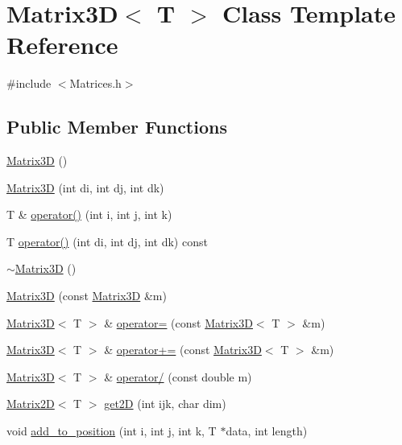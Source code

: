 \hypertarget{classMatrix3D}{}\section{Matrix3D$<$ T $>$ Class Template Reference}
\label{classMatrix3D}


{\ttfamily \#include $<$Matrices.\+h$>$}

\subsection*{Public Member Functions}
\begin{DoxyCompactItemize}
\item 
\mbox{\hyperlink{classMatrix3D_a1589c062f12fbbb1f3681f90c20c4b78}{Matrix3D}} ()
\item 
\mbox{\hyperlink{classMatrix3D_a6c98f06b6f87c600bd9b00f6b253b37e}{Matrix3D}} (int di, int dj, int dk)
\item 
T \& \mbox{\hyperlink{classMatrix3D_a56e772adacd4ccf54388e6c90e3d1269}{operator()}} (int i, int j, int k)
\item 
T \mbox{\hyperlink{classMatrix3D_a600c100c8204bbc8f2e4ebefa55cab82}{operator()}} (int di, int dj, int dk) const
\item 
\mbox{\hyperlink{classMatrix3D_a7fda610223910a2b4dcfea445d2eb6c7}{$\sim$\+Matrix3D}} ()
\item 
\mbox{\hyperlink{classMatrix3D_ae3fc93ef3456a36c92f8cbb7db01c3a9}{Matrix3D}} (const \mbox{\hyperlink{classMatrix3D}{Matrix3D}} \&m)
\item 
\mbox{\hyperlink{classMatrix3D}{Matrix3D}}$<$ T $>$ \& \mbox{\hyperlink{classMatrix3D_a0e84724f089ae3478283ea81d0b866af}{operator=}} (const \mbox{\hyperlink{classMatrix3D}{Matrix3D}}$<$ T $>$ \&m)
\item 
\mbox{\hyperlink{classMatrix3D}{Matrix3D}}$<$ T $>$ \& \mbox{\hyperlink{classMatrix3D_a10b206ad9106931f7aa46a7b4d45c851}{operator+=}} (const \mbox{\hyperlink{classMatrix3D}{Matrix3D}}$<$ T $>$ \&m)
\item 
\mbox{\hyperlink{classMatrix3D}{Matrix3D}}$<$ T $>$ \& \mbox{\hyperlink{classMatrix3D_ad45bff7f2159a4ba0aa4546635e8a73f}{operator/}} (const double m)
\item 
\mbox{\hyperlink{classMatrix2D}{Matrix2D}}$<$ T $>$ \mbox{\hyperlink{classMatrix3D_ac5c77248be46bfef323f0229f6e0a59c}{get2D}} (int ijk, char dim)
\item 
void \mbox{\hyperlink{classMatrix3D_a61afc3a397203f453f60772ebc10758a}{add\+\_\+to\+\_\+position}} (int i, int j, int k, T $\ast$data, int length)

\end{DoxyCompactItemize}
